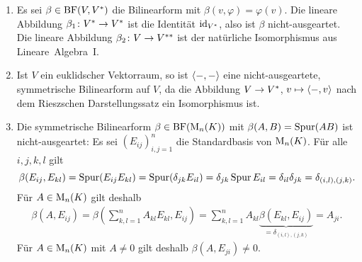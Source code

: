 \begin{example}
  \leavevmode
  \begin{enumerate}
    \item
      Es sei $\beta \in \operatorname{BF}(V, V^*)$ die Bilinearform mit $\beta(v, \varphi) = \varphi(v)$.
      Die lineare Abbildung $\beta_1 \colon V^* \to V^*$ ist die Identität $\operatorname{id}_{V^*}$, also ist $\beta$ nicht-ausgeartet.
      Die lineare Abbildung $\beta_2 \colon V \to V^{**}$ ist der natürliche Isomorphismus aus Lineare~Algebra~I.
    \item
      Ist $V$ ein euklidscher Vektorraum, so ist $\left\langle -, - \right\rangle$ eine nicht-ausgeartete, symmetrische Bilinearform auf $V$, da die Abbildung $V \to V^*$, $v \mapsto \left\langle -, v \right\rangle$ nach dem Rieszschen Darstellungssatz ein Isomorphismus ist.
    \item
      Die symmetrische Bilinearform $\beta \in \operatorname{BF}(\operatorname{M}_{n}(K))$ mit $\beta(A, B) = \operatorname{Spur}(AB)$ ist nicht-ausgeartet:
      Es sei $(E_{ij})_{i,j=1}^n$ die Standardbasis von $\operatorname{M}_{n}(K)$.
      Für alle $i,j,k,l$ gilt
      \[
          \beta(E_{ij}, E_{kl})
        = \operatorname{Spur}(E_{ij} E_{kl})
        = \operatorname{Spur}( \delta_{jk} E_{il} )
        = \delta_{jk} \operatorname{Spur} E_{il}
        = \delta_{il} \delta_{jk}
        = \delta_{(i,l), (j,k)}.
      \]
      Für $A \in \operatorname{M}_{n}(K)$ gilt deshalb
      \begin{align*}
          \beta(A, E_{ij})
        = \beta\left( \sum_{k,l=1}^n A_{kl} E_{kl}, E_{ij} \right)
        = \sum_{k,l=1}^n A_{kl} \underbrace{ \beta(E_{kl}, E_{ij}) }_{= \delta_{(i,l), (j,k)}}
        =  A_{ji}.
      \end{align*}
      Für $A \in \operatorname{M}_{n}(K)$ mit $A \neq 0$ gilt deshalb $\beta(A, E_{ji}) \neq 0$.
  \end{enumerate}
\end{example}



% 
% 
% 



